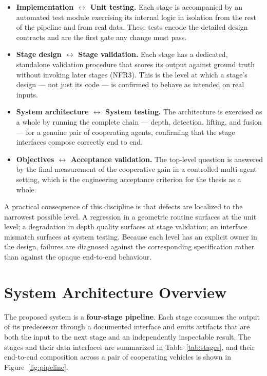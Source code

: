 \begin{itemize}[leftmargin=*,itemsep=4pt]
  \item \textbf{Implementation $\leftrightarrow$ Unit testing.} Each stage is
  accompanied by an automated test module exercising its internal logic in isolation from the rest of the pipeline and from
  real data. These tests encode the detailed design contracts and are the first
  gate any change must pass.
  \item \textbf{Stage design $\leftrightarrow$ Stage validation.} Each stage has a
  dedicated, standalone validation procedure that scores its output against ground
  truth without invoking later stages (NFR3). This is the level at which a stage's
  design --- not just its code --- is confirmed to behave as intended on
  real inputs.
  \item \textbf{System architecture $\leftrightarrow$ System testing.} The
  architecture is exercised as a whole by running the complete chain --- depth,
  detection, lifting, and fusion --- for a genuine pair of cooperating agents,
  confirming that the stage interfaces compose correctly end to end.
  \item \textbf{Objectives $\leftrightarrow$ Acceptance validation.} The top-level
  question is answered by the final measurement of the cooperative gain in a
  controlled multi-agent setting, which is the engineering acceptance criterion for
  the thesis as a whole.
\end{itemize}

A practical consequence of this discipline is that defects are localized to the
narrowest possible level. A regression in a geometric routine surfaces at the unit
level; a degradation in depth quality surfaces at stage validation; an interface
mismatch surfaces at system testing. Because each level has an explicit owner in
the design, failures are diagnosed against the corresponding specification rather
than against the opaque end-to-end behaviour.

\section{System Architecture Overview}
\label{sec:architecture}

The proposed system is a \textbf{four-stage pipeline}. Each stage consumes the
output of its predecessor through a documented interface and emits artifacts that
are both the input to the next stage and an independently inspectable result. The
stages and their data interfaces are summarized in Table~\ref{tab:stages}, and their
end-to-end composition across a pair of cooperating vehicles is shown in
Figure~\ref{fig:pipeline}.

